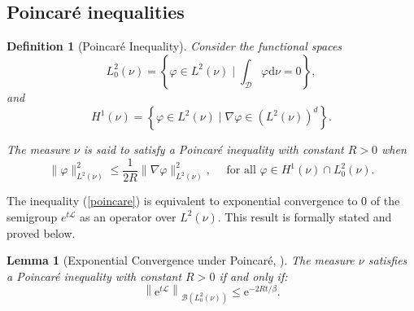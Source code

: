\documentclass[11pt, twoside]{report}
\newtheorem{definition}[theorem]{Definition}
\newtheorem{lemma}[theorem]{Lemma}
\begin{document}
\subsection{Poincar\'{e} inequalities}
\begin{definition}[Poincar\'{e} Inequality]
    Consider the functional spaces
    $$
L_0^2(\nu)=\left\{\varphi \in L^2(\nu) \mid \int_{\mathcal{D}} \varphi \mathrm{d} \nu=0\right\},
$$
and
$$
H^1(\nu)=\left\{\varphi \in L^2(\nu) \mid \nabla \varphi \in\left(L^2(\nu)\right)^d\right\} .
$$

The measure $\nu$ is said to satisfy a Poincaré inequality with constant $R>0$ when
\begin{equation} \label{poincare}
    \|\varphi\|_{L^2(\nu)}^2 \leqslant \frac{1}{2 R}\|\nabla \varphi\|_{L^2(\nu)}^2, \quad \text { for all } \varphi \in H^1(\nu) \cap L_0^2(\nu).
\end{equation}
\end{definition}
The inequality (\ref{poincare}) is equivalent to exponential convergence to 0 of the semigroup $e^{t\mathcal{L}}$ as an operator over $L^2(\nu)$. This result is formally stated and proved below.
\begin{lemma}[Exponential Convergence under Poincar\'{e}, \texorpdfstring{\cite[Proposition~2.3]{Lelievre2016-hx}}{}]
The measure $\nu$ satisfies a Poincar\'{e} inequality with constant $R>0$ if and only if:
\begin{equation}
\left\|\mathrm{e}^{t \mathcal{L}}\right \|_{\mathcal{B}\left(L_0^2(\nu)\right)} \leqslant \mathrm{e}^{-2 R t / \beta}.
\end{equation}
\end{lemma}
\end{document}
